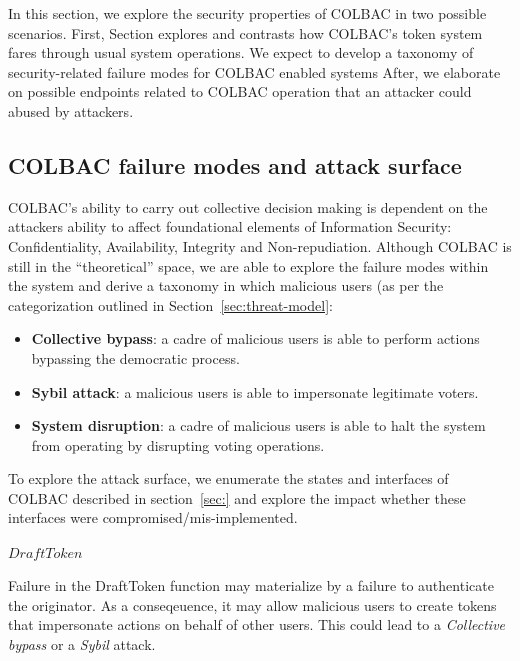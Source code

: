 In this section, we explore the security properties of COLBAC in two possible
scenarios.  First, Section explores and contrasts how COLBAC's token system
fares through usual system operations. We expect to develop a taxonomy of
security-related failure modes for COLBAC enabled systems After, we elaborate
on possible endpoints related to COLBAC operation that an attacker could abused
by attackers.

\subsection{COLBAC failure modes and attack surface}

COLBAC's ability to carry out collective decision making is dependent on the
attackers ability to affect foundational elements of Information Security:
Confidentiality, Availability, Integrity and Non-repudiation. Although COLBAC
is still in the ``theoretical'' space, we are able to explore the failure modes
within the system and derive a taxonomy in which malicious users (as per the
categorization outlined in Section~\ref{sec:threat-model}:

\begin{itemize}
    \item {\bf Collective bypass}: a cadre of malicious users is able
        to perform actions bypassing the democratic process.

    \item {\bf Sybil attack}: a malicious users is able
        to impersonate legitimate voters.

    \item {\bf System disruption}: a cadre of malicious users is able to halt
        the system from operating by disrupting voting operations.

\end{itemize}

To explore the attack surface, we enumerate the states and interfaces of
COLBAC described in section~\ref{sec:} and explore the impact whether these
interfaces were compromised/mis-implemented.
        
\paragraph{$DraftToken$} Failure in the DraftToken function may materialize by
a failure to authenticate the originator. As a conseqeuence, it may allow
malicious users to create tokens that impersonate actions on behalf of other
users. This could lead to a \emph{Collective bypass} or a \emph{Sybil} attack. 

